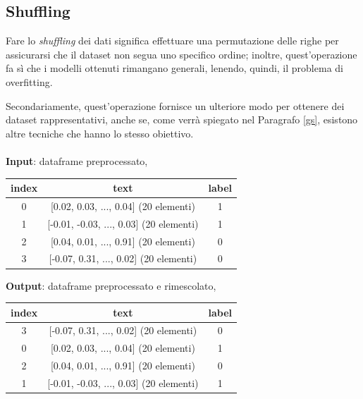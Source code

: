 \documentclass[12pt]{report}
\theoremstyle{definition}
\begin{document}
\subsection{Shuffling}
Fare lo \textit{shuffling} dei dati significa effettuare una permutazione delle righe per assicurarsi che il dataset non segua uno specifico ordine; inoltre, quest'operazione fa sì che i modelli ottenuti rimangano generali, lenendo, quindi, il problema di overfitting.

Secondariamente, quest'operazione fornisce un ulteriore modo per ottenere dei dataset rappresentativi, anche se, come verrà spiegato nel Paragrafo \ref{gs}, esistono altre tecniche che hanno lo stesso obiettivo. 
\\
\\
\textbf{Input}: dataframe preprocessato,
\begin{center}
    \begin{tabular}{|c|c|c|}
    \hline
    \textbf{index} & \textbf{text} & \textbf{label} \\
    \hline
         0 & [0.02, 0.03, ..., 0.04] (20 elementi) & 1 \\
         1 & [-0.01, -0.03, ..., 0.03] (20 elementi) & 1 \\
         2 & [0.04, 0.01, ..., 0.91] (20 elementi) & 0 \\
         3 & [-0.07, 0.31, ..., 0.02] (20 elementi) & 0 \\
    \hline
    \end{tabular}
\end{center}
\textbf{Output}: dataframe preprocessato e rimescolato,
\begin{center}
    \begin{tabular}{|c|c|c|}
    \hline
    \textbf{index} & \textbf{text} & \textbf{label} \\
    \hline
        3 & [-0.07, 0.31, ..., 0.02] (20 elementi) & 0 \\
        0 & [0.02, 0.03, ..., 0.04] (20 elementi) & 1 \\
        2 & [0.04, 0.01, ..., 0.91] (20 elementi) & 0 \\
        1 & [-0.01, -0.03, ..., 0.03] (20 elementi) & 1 \\
    \hline
    \end{tabular}
\end{center}
\end{document}
